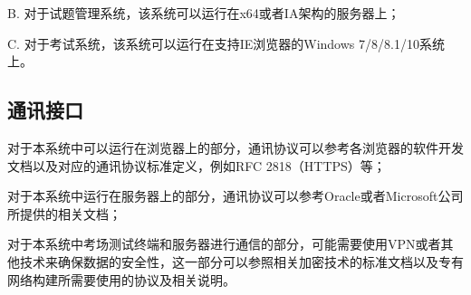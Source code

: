 B. 对于试题管理系统，该系统可以运行在x64或者IA架构的服务器上；

C. 对于考试系统，该系统可以运行在支持IE浏览器的Windows 7/8/8.1/10系统上。

\subsection{通讯接口}
对于本系统中可以运行在浏览器上的部分，通讯协议可以参考各浏览器的软件开发文档以及对应的通讯协议标准定义，例如RFC 2818（HTTPS）等；

对于本系统中运行在服务器上的部分，通讯协议可以参考Oracle或者Microsoft公司所提供的相关文档；

对于本系统中考场测试终端和服务器进行通信的部分，可能需要使用VPN或者其他技术来确保数据的安全性，这一部分可以参照相关加密技术的标准文档以及专有网络构建所需要使用的协议及相关说明。
